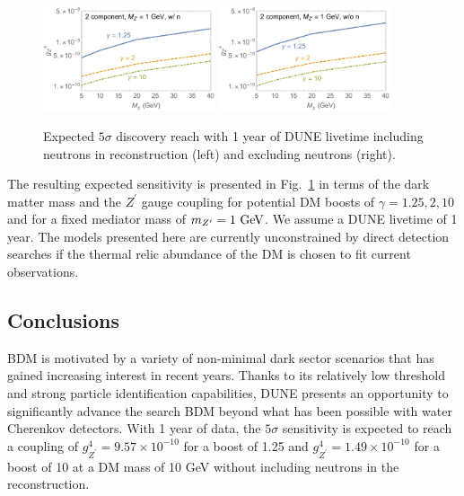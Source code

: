 \begin{figure}[!htb]
\centering
\includegraphics[width=0.45\textwidth]{graphics/expected-discovery-with-n.pdf}\hspace{0.05\textwidth}
\includegraphics[width=0.45\textwidth]{graphics/expected-discovery-no-n.pdf}
\caption{Expected $5\sigma$ discovery reach with 1 year of DUNE livetime including neutrons in reconstruction (left) and excluding neutrons (right).\label{fig:significance}}
\end{figure}
The resulting expected sensitivity is presented in Fig.~\ref{fig:significance} in terms of the dark matter mass and the $Z^\prime$ gauge coupling for potential DM boosts of $\gamma = 1.25,2,10$ and for a fixed mediator mass of $m_{Z^\prime} = 1~{\rm GeV}$.  We assume a DUNE livetime of 1 year.  The models presented here are currently unconstrained by direct detection searches if the thermal relic abundance of the DM is chosen to fit current observations.

\subsection{Conclusions}

BDM is motivated by a variety of non-minimal dark sector scenarios that has gained increasing interest in recent years. Thanks to its relatively low threshold and strong particle identification capabilities, DUNE presents an opportunity to significantly advance the search BDM beyond what has been possible with water Cherenkov detectors. With 1 year of data, the $5\sigma$ sensitivity is expected to reach a coupling of $g_{Z^\prime}^4 = 9.57 \times 10^{-10}$ for a boost of 1.25 and $g_{Z^\prime}^4 = 1.49 \times 10^{-10}$ for a boost of 10 at a DM mass of 10 GeV without including neutrons in the reconstruction.


